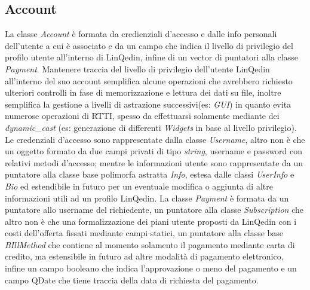 \subsection*{Account}
La classe \textit{Account} è formata da credienziali d'accesso e dalle info personali dell'utente a cui è associato e da un campo
che indica il livello di privilegio del profilo utente all'interno di LinQedin, infine di un vector di puntatori alla classe \textit{Payment}.
Mantenere traccia del livello di privilegio dell'utente LinQedin all'interno del suo account semplifica alcune operazioni che avrebbero richiesto
ulteriori controlli in fase di memorizzazione e lettura dei dati su file, inoltre semplifica la gestione a livelli di astrazione successivi(es: \textit{GUI})
in quanto evita numerose operazioni di RTTI, spesso da effettuarsi solamente mediante dei \textit{dynamic\_cast} (es: generazione di differenti \textit{Widgets} in base al livello privilegio).
Le credenziali d'accesso sono rappresentate dalla classe \textit{Username}, altro non è che un oggetto formato da due campi privati di tipo \textit{string},
username e password con relativi metodi d'accesso; mentre le informazioni utente sono rappresentate da un puntatore alla classe base polimorfa astratta \textit{Info},
estesa dalle classi \textit{UserInfo} e \textit{Bio} ed estendibile in futuro per un eventuale modifica o aggiunta di altre informazioni utili ad un profilo LinQedin.
La classe \textit{Payment} è formata da un puntatore allo username del richiedente, un puntatore alla classe \textit{Subscription} che altro non è che una formalizzazione
dei piani utente proposti da LinQedin con i costi dell'offerta fissati mediante campi statici, un puntatore alla classe base \textit{BIllMethod} che contiene al momento
solamento il pagamento mediante carta di credito, ma estensibile in futuro ad altre modalità di pagamento elettronico, infine un campo booleano che indica l'approvazione o meno
del pagamento e un campo QDate che tiene traccia della data di richiesta del pagamento.
